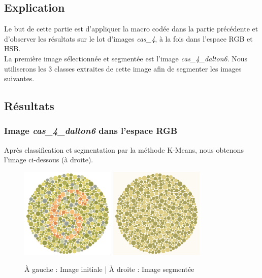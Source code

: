 \documentclass[a4paper]{article}
\begin{document}
\subsection{Explication}

Le but de cette partie est d'appliquer la macro codée dans la partie précédente et d'observer les résultats sur le lot d'images {\em cas\_4}, à la fois dans l'espace RGB et HSB.\\

La première image sélectionnée et segmentée est l'image {\em cas\_4\_dalton6}. Nous utiliserons les 3 classes extraites de cette image afin de segmenter les images suivantes.

\subsection{Résultats}

\subsubsection{Image {\em cas\_4\_dalton6} dans l'espace RGB}

Après classification et segmentation par la méthode K-Means, nous obtenons l'image ci-dessous (à droite).

\begin{figure}[H]
\begin{center}
\includegraphics[width=170px]{../base/cas_4_dalton6.png}
\includegraphics[width=170px]{../resultats/cas_4_dalton6_seg.png}
\end{center}
\caption{À gauche : Image initiale | À droite : Image segmentée}
\end{figure}
\end{document}

